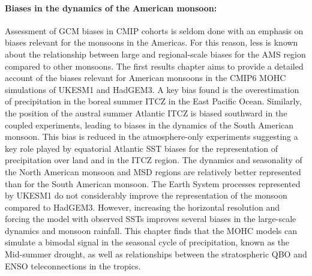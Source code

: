 \paragraph{Biases in the dynamics of the American monsoon:}
Assessment of GCM biases in CMIP cohorts is seldom done with an emphasis on biases relevant for the monsoons in the Americas. 
For this reason, less is known about the relationship between large and regional-scale biases for the AMS region compared to other monsoons. 
The first results chapter aims to provide a detailed account of the biases relevant for American monsoons in the CMIP6 MOHC simulations of UKESM1 and HadGEM3. 
A key bias found is the overestimation of precipitation in the boreal summer ITCZ in the East Pacific Ocean. 
Similarly, the position of the austral summer Atlantic ITCZ is biased southward in the coupled experiments, leading to biases in the dynamics of the South American monsoon. 
This bias is reduced in the atmosphere-only experiments suggesting a key role played by equatorial Atlantic SST biases for the representation of precipitation over land and in the ITCZ region.
The dynamics and seasonality of the North American monsoon and MSD regions are relatively better represented than for the South American monsoon.
The Earth System processes represented by UKESM1 do not considerably improve the representation of the monsoon compared to HadGEM3. 
However, increasing the horizontal resolution and forcing the model with observed SSTs improves several biases in the large-scale dynamics and monsoon rainfall. 
This chapter finds that the MOHC models can simulate a bimodal signal in the seasonal cycle of precipitation, known as the Mid-summer drought, as well as relationships between the stratospheric QBO and ENSO teleconnections in the tropics. 

